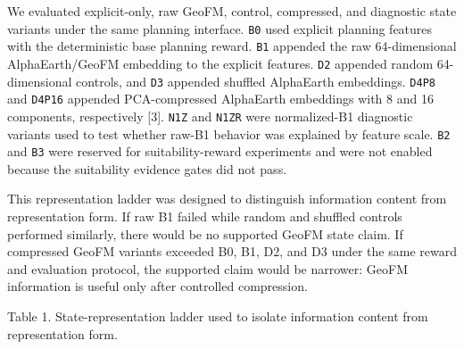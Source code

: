 \documentclass[
  11pt,
  a4paper,
]{article}
\begin{document}
We evaluated explicit-only, raw GeoFM, control, compressed, and
diagnostic state variants under the same planning interface. \texttt{B0}
used explicit planning features with the deterministic base planning
reward. \texttt{B1} appended the raw 64-dimensional AlphaEarth/GeoFM
embedding to the explicit features. \texttt{D2} appended random
64-dimensional controls, and \texttt{D3} appended shuffled AlphaEarth
embeddings. \texttt{D4P8} and \texttt{D4P16} appended PCA-compressed
AlphaEarth embeddings with 8 and 16 components, respectively {[}3{]}.
\texttt{N1Z} and \texttt{N1ZR} were normalized-B1 diagnostic variants
used to test whether raw-B1 behavior was explained by feature scale.
\texttt{B2} and \texttt{B3} were reserved for suitability-reward
experiments and were not enabled because the suitability evidence gates
did not pass.

This representation ladder was designed to distinguish information
content from representation form. If raw B1 failed while random and
shuffled controls performed similarly, there would be no supported GeoFM
state claim. If compressed GeoFM variants exceeded B0, B1, D2, and D3
under the same reward and evaluation protocol, the supported claim would
be narrower: GeoFM information is useful only after controlled
compression.

Table 1. State-representation ladder used to isolate information content
from representation form.
\end{document}
